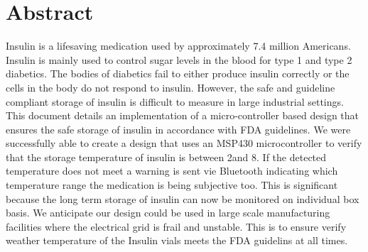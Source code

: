 \section*{Abstract}
Insulin is a lifesaving medication used by approximately 7.4 million Americans. Insulin is mainly used to control sugar levels in the blood for type 1 and type 2 diabetics. The bodies of diabetics fail to either produce insulin correctly or the cells in the body do not respond to insulin. However, the safe and guideline compliant storage of insulin is difficult to measure in large industrial settings. This document details an implementation of a micro-controller based design that ensures the safe storage of insulin in accordance with FDA guidelines. We were successfully able to create a design that uses an MSP430 microcontroller to verify that the storage temperature of insulin is between 2\textcelsius and 8\textcelsius. If the detected temperature does not meet a warning is sent vie Bluetooth indicating which temperature range the medication is being subjective too. This is significant because the long term storage of insulin can now be monitored on individual box basis. We anticipate our design could be used in large scale manufacturing facilities where the electrical grid is frail and unstable. This is to ensure verify weather temperature of the Insulin vials meets the FDA guidelins at all times.
